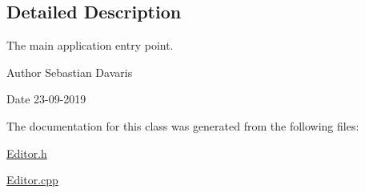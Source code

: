 \subsection{Detailed Description}
The main application entry point. \begin{DoxyAuthor}{Author}
Sebastian Davaris 
\end{DoxyAuthor}
\begin{DoxyDate}{Date}
23-\/09-\/2019 
\end{DoxyDate}


The documentation for this class was generated from the following files\+:\begin{DoxyCompactItemize}
\item 
\hyperlink{_editor_8h}{Editor.\+h}\item 
\hyperlink{_editor_8cpp}{Editor.\+cpp}\end{DoxyCompactItemize}
